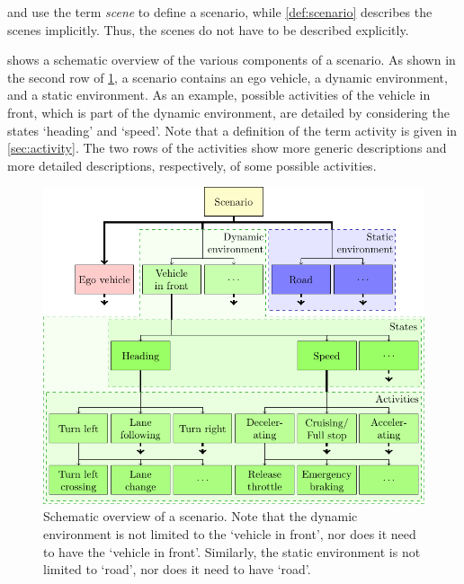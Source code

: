 
\textcite{geyer2014} and \textcite{ulbrich2015} use the term \emph{scene} to define a scenario, while \cref{def:scenario} describes the scenes implicitly. Thus, the scenes do not have to be described explicitly.

 shows a schematic overview of the various components of a scenario. As shown in the second row of \cref{fig:scenario}, a scenario contains an ego vehicle, a dynamic environment, and a static environment. As an example, possible activities of the vehicle in front, which is part of the dynamic environment, are detailed by considering the states `heading' and `speed'. Note that a definition of the term activity is given in \cref{sec:activity}. The two rows of the activities show more generic descriptions and more detailed descriptions, respectively, of some possible activities.

\begin{figure}
	\centering
	\includegraphics[width=0.5\linewidth]{figures/scenario.pdf}%
	\caption{Schematic overview of a scenario. Note that the dynamic environment is not limited to the `vehicle in front', nor does it need to have the `vehicle in front'. Similarly, the static environment is not limited to `road', nor does it need to have `road'.}
	\label{fig:scenario}
\end{figure}

